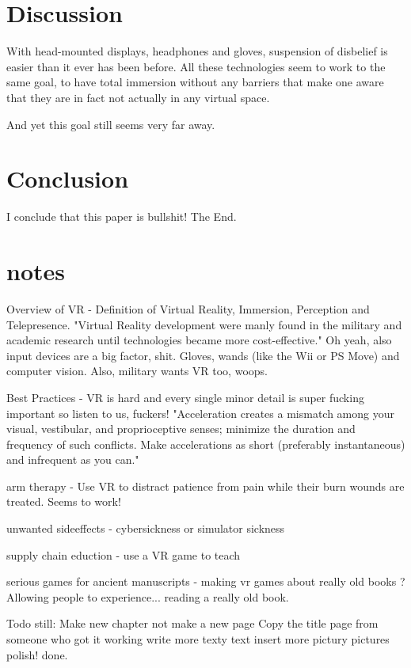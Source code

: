 \documentclass[11pt]{article}
\begin{document}
	
	


\section{Discussion}
With head-mounted displays, headphones and gloves, suspension of disbelief is easier than it ever has been before. All these technologies seem to work to the same goal, to have total immersion without any barriers that make one aware that they are in fact not actually in any virtual space.

And yet this goal still seems very far away.


\section{Conclusion}
I conclude that this paper is bullshit! The End.




\section{notes}
Overview of VR - Definition of Virtual Reality, Immersion, Perception and Telepresence. 
"Virtual Reality development were manly found in the military and academic research until technologies became more cost-effective."
Oh yeah, also input devices are a big factor, shit. Gloves, wands (like the Wii or PS Move) and computer vision.
Also, military wants VR too, woops.
	
Best Practices - VR is hard and every single minor detail is super fucking important so listen to us, fuckers!
"Acceleration creates a mismatch among your visual, vestibular, and proprioceptive senses;
minimize the duration and frequency of such conflicts. Make accelerations as short (preferably
instantaneous) and infrequent as you can."

arm therapy - Use VR to distract patience from pain while their burn wounds are treated. Seems to work!

unwanted sideeffects - cybersickness or simulator sickness

supply chain eduction - use a VR game to teach

serious games for ancient manuscripts - making vr games about really old books ? Allowing people to experience... reading a really old book.

Todo still:
Make new chapter not make a new page
Copy the title page from someone who got it working
write more texty text
insert more pictury pictures
polish!
done.
\end{document}

